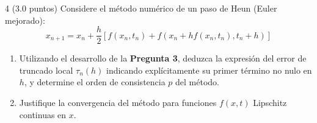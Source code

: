 \vspace{0.5cm}

\begin{ejer}{4 (3.0 puntos)}
Considere el método numérico de un paso de Heun (Euler mejorado):
$$x_{n+1} = x_n + \frac{h}{2}\left[f(x_n, t_n) + f(x_n + h f(x_n, t_n), t_n + h)\right]$$
\begin{enumerate}
    \item Utilizando el desarrollo de la \textbf{Pregunta 3}, deduzca la expresión del error de truncado local $\tau_n(h)$ indicando explícitamente su primer término no nulo en $h$, y determine el orden de consistencia $p$ del método.
    \item Justifique la convergencia del método para funciones $f(x, t)$ Lipschitz continuas en $x$.
\end{enumerate}
\end{ejer}

